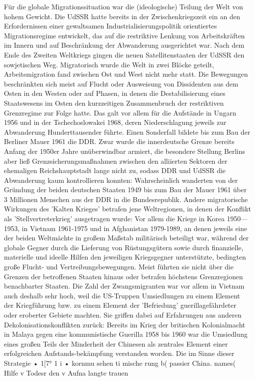 \documentclass[letterpaper, 12pt]{article}
\begin{document}
Für die globale Migrationssituation war die (ideologische) Teilung der Welt von hohem Gewicht. Die UdSSR hatte bereits in der Zwischenkriegszeit ein an den Erfordernissen einer gewaltsamen Industrialisierungspolitik orientiertes Migrationsregime entwickelt, das auf die restriktive Lenkung von Arbeitskräften im Innern und auf Beschränkung der Abwanderung ausgerichtet war. Nach dem Ende des Zweiten Weltkriegs gingen die neuen Satellitenstaaten der UdSSR den sowjetischen Weg. Migratorisch wurde die Welt in zwei Blöcke geteilt, Arbeitsmigration fand zwischen Ost und West nicht mehr statt. Die Bewegungen beschränkten sich meist auf Flucht oder Ausweisung von Dissidenten aus dem Osten in den Westen oder auf Phasen, in denen die Destabilisierung eines Staatswesens im Osten den kurzzeitigen Zusammenbruch der restriktiven Grenzregime zur Folge hatte. Das galt vor allem für die Aufstände in Ungarn 1956 und in der Tschechoslowakei 1968, deren Niederschlagung jeweils zur Abwanderung Hunderttausender führte. Einen Sonderfall bildete bis zum Bau der Berliner Mauer 1961 die DDR. Zwar wurde die innerdeutsche Grenze bereits Anfang der 1950er Jahre unüberwindbar armiert, die besondere Stellung Berlins aber ließ Grenzsicherungsmaßnahmen zwischen den alliierten Sektoren der ehemaligen Reichshauptstadt lange nicht zu, sodass DDR und UdSSR die Abwanderung kaum kontrollieren konnten: Wahrscheinlich wanderten von der Gründung der beiden deutschen Staaten 1949 bis zum Bau der Mauer 1961 über 3 Millionen Menschen aus der DDR in die Bundesrepublik. Andere migratorische Wirkungen des 'Kalten Krieges' betrafen jene Weltregionen, in denen der Konflikt als 'Stellvertreterkrieg' ausgetragen wurde: Vor allem die Kriege in Korea 1950— 1953, in Vietnam 1961-1975 und in Afghanistan 1979-1989, an denen jeweils eine der beiden Weltmächte in großem Maßstab militärisch beteiligt war, während der globale Gegner durch die Lieferung von Rüstungsgütern sowie durch finanzielle, materielle und ideelle Hilfen den jeweiligen Kriegsgegner unterstützte, bedingten große Flucht- und Vertreibungsbewegungen. Meist führten sie nicht über die Grenzen der betroffenen Staaten hinaus oder betrafen höchstens Grenzregionen benachbarter Staaten. Die Zahl der Zwangsmigranten war vor allem in Vietnam auch deshalb sehr hoch, weil die US-Truppen Umsiedlungen zu einem Element der Kriegführung bzw. zu einem Element der 'Befriedung' guerillagefährdeter oder eroberter Gebiete machten. Sie griffen dabei auf Erfahrungen aus anderen Dekolonisationskonflikten zurück: Bereits im Krieg der britischen Kolonialmacht in Malaya gegen eine kommunistische Guerilla 1958 bis 1960 war die Umsiedlung eines großen Teils der Minderheit der Chinesen als zentrales Element einer erfolgreichen Aufstands-bekämpfung verstanden worden. Die im Sinne dieser Strategie 
• 1[7° 1 i • 
kornmu sehen ti mische rung b( passier China. names( Hilfe v Todesr den v Aufna langte trauen 

\clearpage


\end{document}
